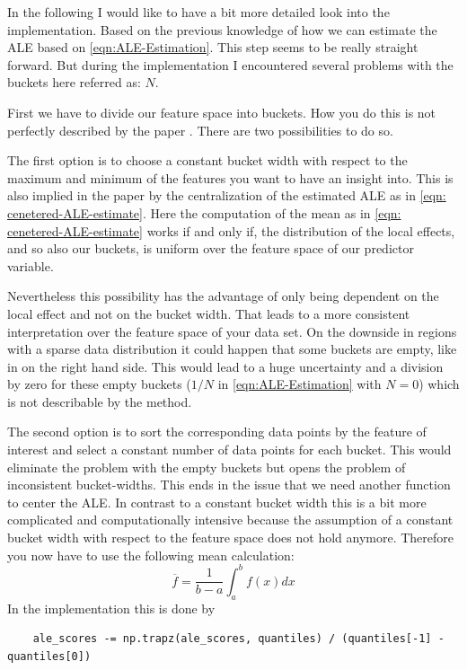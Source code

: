 \documentclass[11pt,
  a4paper,
  parskip=half, %
  BCOR=10mm, %
  english,
  ]{article}
\begin{document}
In the following I would like to have a bit more detailed look into the implementation. 
Based on the previous knowledge of how we can estimate the ALE based on \eqref{eqn:ALE-Estimation}. This step seems to be really straight forward. But during the implementation I encountered several problems with the buckets here referred as: $N$.

First we have to divide our feature space into buckets. How you do this is not perfectly described by the paper \cite{ALE-paper}. 
There are two possibilities to do so. 

The first option is to choose a constant bucket width with respect to the maximum and minimum
of the features you want to have an insight into. This is also implied in the paper by the centralization of the estimated ALE as in \eqref{eqn: cenetered-ALE-estimate}. Here the computation of the mean as in \eqref{eqn: cenetered-ALE-estimate} works if and only if, the 
distribution of the local effects, and so also our buckets, is uniform over the feature space of our predictor variable.

Nevertheless this possibility has the advantage of only being dependent on the local effect and not on the bucket width. 
That leads to a more consistent interpretation over the feature space of your data set.
On the downside in regions with a sparse data distribution it could happen that some buckets are empty,
like in  on the right hand side.
This would lead to a huge uncertainty and a division by zero for these empty buckets
($1/N$ in \eqref{eqn:ALE-Estimation} with $N =  0$) which is not describable by the method. 

The second option is to sort the corresponding data points by the feature of interest and select a constant number of 
data points for each bucket. This would eliminate the problem with the empty buckets but opens the problem of inconsistent 
bucket-widths. This ends in the issue that we need another function to center the ALE. In contrast to a constant bucket width this is a bit more complicated and computationally intensive because the assumption of a constant bucket width with respect to the feature space does not hold anymore.
Therefore you now have to use the following mean calculation:
\begin{equation*}
    \overline{f} = \frac{1}{b-a} \int_a^b f(x) dx
\end{equation*}
In the implementation this is done by
\begin{verbatim}
    ale_scores -= np.trapz(ale_scores, quantiles) / (quantiles[-1] - quantiles[0]) 
\end{verbatim}
\end{document}
